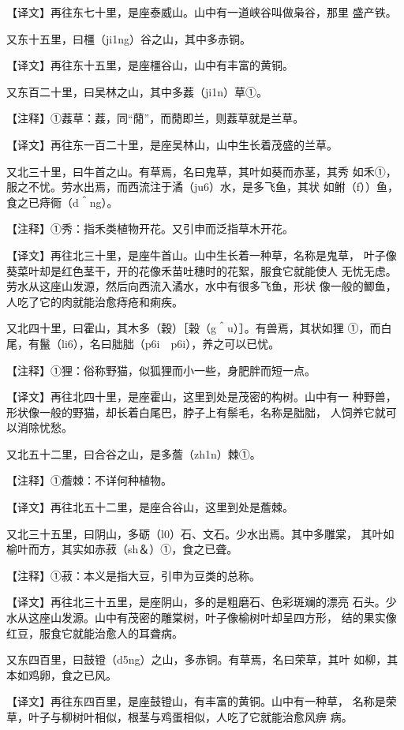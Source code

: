\documentclass[a4paper,12pt,UTF8,twoside]{ctexbook}
\begin{document}
【译文】再往东七十里，是座泰威山。山中有一道峡谷叫做枭谷，那里 盛产铁。

又东十五里，曰橿（ji1ng）谷之山，其中多赤铜。

【译文】再往东十五里，是座橿谷山，山中有丰富的黄铜。

又东百二十里，曰吴林之山，其中多葌（ji1n）草①。

【注释】①葌草：葌，同“蕑”，而蕑即兰，则葌草就是兰草。

【译文】再往东一百二十里，是座吴林山，山中生长着茂盛的兰草。

又北三十里，曰牛首之山。有草焉，名曰鬼草，其叶如葵而赤茎，其秀 如禾①，服之不忧。劳水出焉，而西流注于潏（ju6）水，是多飞鱼，其状 如鲋（f））鱼，食之已痔衕（d＾ng）。

【注释】①秀：指禾类植物开花。又引申而泛指草木开花。

【译文】再往北三十里，是座牛首山。山中生长着一种草，名称是鬼草， 叶子像葵菜叶却是红色茎干，开的花像禾苗吐穗时的花絮，服食它就能使人 无忧无虑。劳水从这座山发源，然后向西流入潏水，水中有很多飞鱼，形状 像一般的鲫鱼，人吃了它的肉就能治愈痔疮和痢疾。

又北四十里，曰霍山，其木多（穀）［榖（g＾u）］。有兽焉，其状如狸 ①，而白尾，有鬣（li6），名曰胐胐（p6i　p6i），养之可以已忧。

【注释】①狸：俗称野猫，似狐狸而小一些，身肥胖而短一点。

【译文】再往北四十里，是座霍山，这里到处是茂密的构树。山中有一 种野兽，形状像一般的野猫，却长着白尾巴，脖子上有鬃毛，名称是胐胐， 人饲养它就可以消除忧愁。

又北五十二里，曰合谷之山，是多薝（zh1n）棘①。

【注释】①薝棘：不详何种植物。

【译文】再往北五十二里，是座合谷山，这里到处是薝棘。

又北三十五里，曰阴山，多砺（l0）石、文石。少水出焉。其中多雕棠， 其叶如榆叶而方，其实如赤菽（sh＆）①，食之已聋。

【注释】①菽：本义是指大豆，引申为豆类的总称。

【译文】再往北三十五里，是座阴山，多的是粗磨石、色彩斑斓的漂亮 石头。少水从这座山发源。山中有茂密的雕棠树，叶子像榆树叶却呈四方形， 结的果实像红豆，服食它就能治愈人的耳聋病。

又东四百里，曰鼓镫（d5ng）之山，多赤铜。有草焉，名曰荣草，其叶 如柳，其本如鸡卵，食之已风。

【译文】再往东四百里，是座鼓镫山，有丰富的黄铜。山中有一种草， 名称是荣草，叶子与柳树叶相似，根茎与鸡蛋相似，人吃了它就能治愈风痹 病。
\end{document}
